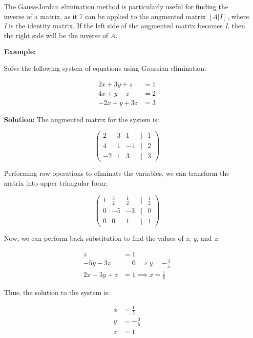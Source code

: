 The Gauss-Jordan elimination method is particularly useful for finding the inverse of a matrix, as it 7
can be applied to the augmented matrix \([A | I]\), where \emph{I} is the identity matrix. If the left side 
of the augmented matrix becomes \emph{I}, then the right side will be the inverse of \emph{A}.
\vspace{\baselineskip}

\textbf{Example:}
\vspace{\baselineskip}

Solve the following system of equations using Gaussian elimination:

\begin{align*}
	2x + 3y + z  & = 1 \\
	4x + y - z   & = 2 \\
	-2x + y + 3z & = 3
\end{align*}

\textbf{Solution:} The augmented matrix for the system is:

\[
	\begin{pmatrix}
		2  & 3 & 1  & | & 1 \\
		4  & 1 & -1 & | & 2 \\
		-2 & 1 & 3  & | & 3
	\end{pmatrix}
\]

Performing row operations to eliminate the variables, we can transform the matrix into upper triangular form:

\[
	\begin{pmatrix}
		1 & \frac{3}{2} & \frac{1}{2} & | & \frac{1}{2} \\
		0 & -5          & -3          & | & 0           \\
		0 & 0           & 1           & | & 1
	\end{pmatrix}
\]

Now, we can perform back substitution to find the values of \emph{x}, \emph{y}, and \emph{z}:

\begin{align*}
	z           & = 1                           \\
	-5y - 3z    & = 0 \implies y = -\frac{3}{5} \\
	2x + 3y + z & = 1 \implies x = \frac{1}{5}
\end{align*}

Thus, the solution to the system is:

\begin{align*}
	x & = \frac{1}{5}  \\
	y & = -\frac{3}{5} \\
	z & = 1
\end{align*}

